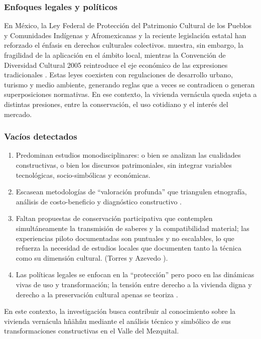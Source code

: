 \subsubsection{Enfoques legales y políticos}

En México, la Ley Federal de Protección del Patrimonio Cultural de los Pueblos y Comunidades Indígenas y Afromexicanas \cite{ley2023patrimonio} y la reciente legislación estatal han reforzado el énfasis en derechos culturales colectivos. \cite{sanchez2013legislacion} muestra, sin embargo, la fragilidad de la aplicación en el ámbito local, mientras la Convención de Diversidad Cultural 2005 reintroduce el eje económico de las expresiones tradicionales \cite{UNESCO2005diversidad}. Estas leyes coexisten con regulaciones de desarrollo urbano, turismo y medio ambiente, generando reglas que a veces se contradicen o generan superposiciones normativas. En ese contexto, la vivienda vernácula queda sujeta a distintas presiones, entre la conservación, el uso cotidiano y el interés del mercado.

\subsubsection{Vacíos detectados}

\begin{enumerate}
	\item Predominan estudios monodisciplinares: o bien se analizan las cualidades constructivas, o bien los discursos patrimoniales, sin integrar variables tecnológicas, socio-simbólicas y económicas.

	\item Escasean metodologías de ``valoración profunda'' que triangulen etnografía, análisis de costo-beneficio y diagnóstico constructivo \citep{delatorre2002values}.

	\item Faltan propuestas de conservación participativa que contemplen simultáneamente la transmisión de saberes y la compatibilidad material; las experiencias piloto documentadas son puntuales y no escalables, lo que refuerza la necesidad de estudios locales que documenten tanto la técnica como su dimensión cultural. (Torres y Azevedo \citeyear{torres2021transmision}).

	\item Las políticas legales se enfocan en la ``protección'' pero poco en las dinámicas vivas de uso y transformación; la tensión entre derecho a la vivienda digna y derecho a la preservación cultural apenas se teoriza \citep{herrejon1994}.
\end{enumerate}

En este contexto, la investigación busca contribuir al conocimiento sobre la vivienda vernácula hñähñu mediante el análisis técnico y simbólico de sus transformaciones constructivas en el Valle del Mezquital.
